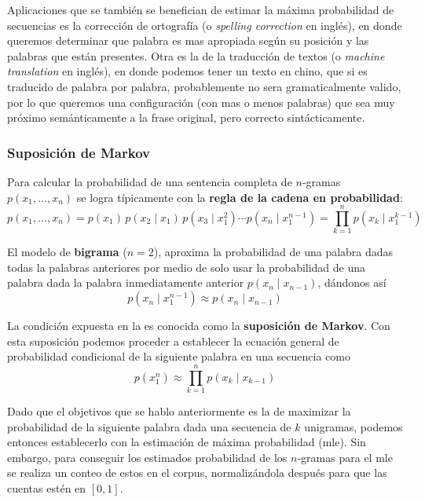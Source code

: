 Aplicaciones que se también se benefician de estimar la máxima probabilidad de secuencias es la corrección de ortografía (o \textsl{spelling correction} en inglés), en donde queremos determinar que palabra es mas apropiada según su posición y las palabras que están presentes. Otra es la de la traducción de textos (o \textsl{machine translation} en inglés), en donde podemos tener un texto en chino, que si es traducido de palabra por palabra, probablemente no sera gramaticalmente valido, por lo que queremos una configuración (con mas o menos palabras) que sea muy próximo semánticamente a la frase original, pero correcto sintácticamente.

\subsubsection{Suposición de Markov}
Para calcular la probabilidad de una sentencia completa de $n$-gramas $p(x_1, \ldots, x_n)$ se logra típicamente con la \textbf{regla de la cadena en probabilidad}:
\begin{equation}
  p(x_1, \ldots, x_n) = p(x_1)\, p(x_2 \mid x_1)\, p(x_3 \mid x_1^2) \cdots p(x_n \mid x_1^{n-1}) = \prod_{k=1}^{n} p(x_k \mid x_1^{k-1})
\end{equation}

El modelo de \textbf{bigrama} ($n=2$), aproxima la probabilidad de una palabra dadas todas la palabras anteriores por medio de solo usar la probabilidad de una palabra dada la palabra inmediatamente anterior $p(x_n \mid x_{n-1})$, dándonos así
\begin{equation} \label{eq:markov-assumption}
  p(x_n \mid x_1^{n-1}) \approx p(x_n \mid x_{n-1})
\end{equation}

La condición expuesta en la  es conocida como la \textbf{suposición de Markov}. Con esta suposición podemos proceder a establecer la ecuación general de probabilidad condicional de la siguiente palabra en una secuencia como
\begin{equation}
  p(x_1^{n}) \approx \prod_{k=1}^{n} p(x_k \mid x_{k-1})
\end{equation}

Dado que el objetivos que se hablo anteriormente es la de maximizar la probabilidad de la siguiente palabra dada una secuencia de $k$ unigramas, podemos entonces establecerlo con la estimación de máxima probabilidad (\gls{mle}). Sin embargo, para conseguir los estimados probabilidad de los $n$-gramas para el \gls{mle} se realiza un conteo de estos en el \gls{corpus}, normalizándola después para que las cuentas estén en $[0, 1]$.

